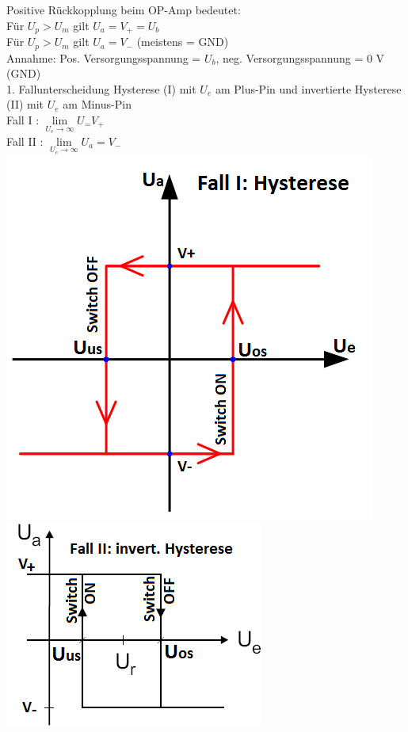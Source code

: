\documentclass[fs, footer]{latex4ei}
\begin{document}
\begin{multicols*}{4}
{Positive Rückkopplung beim OP-Amp bedeutet: \\
Für $U_p > U_m$ gilt $U_a = V_+ = U_b$ \\
Für $U_p > U_m$ gilt $U_a = V_-$ (meistens = GND) \\


Annahme: Pos. Versorgungsspannung = $U_b$, neg. Versorgungsspannung = 0 V (GND) \\

1. Fallunterscheidung Hysterese (I) mit $U_e$ am Plus-Pin und invertierte Hysterese (II) mit $U_e$ am Minus-Pin\\
Fall I : \(\lim\limits_{U_e \to \infty} U_ = V_+ \) \\
Fall II : \(\lim\limits_{U_e \to \infty} U_a = V_- \) \\
\includegraphics[scale = 0.2]{./img/Hysterese.png}
\includegraphics[scale = 0.4]{./img/Hysterese_invertiert.png}

}
\end{multicols*}
\end{document}
